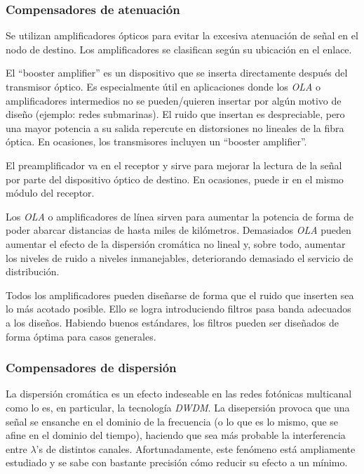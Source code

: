 \subsubsection{Compensadores de atenuación}
\label{sec:amplificadores}


Se utilizan amplificadores ópticos para evitar la excesiva atenuación
de señal en el nodo de destino. Los amplificadores se clasifican según
su ubicación en el enlace.

El ``booster amplifier'' es un dispositivo que se inserta directamente
después del transmisor óptico. Es especialmente útil en aplicaciones
donde los \emph{OLA} o amplificadores intermedios no se pueden/quieren
insertar por algún motivo de diseño (ejemplo: redes submarinas). El
ruido que insertan es despreciable, pero una mayor potencia a su
salida repercute en distorsiones no lineales de la fibra óptica. En
ocasiones, los transmisores incluyen un ``booster amplifier''.

El preamplificador va en el receptor y sirve para mejorar la lectura
de la señal por parte del dispositivo óptico de destino. En ocasiones,
puede ir en el mismo módulo del receptor.

Los \emph{OLA} o amplificadores de línea sirven para aumentar la
potencia de forma de poder abarcar distancias de hasta miles de
kilómetros. Demasiados \emph{OLA} pueden aumentar el efecto de la
dispersión cromática no lineal y, sobre todo, aumentar los niveles de
ruido a niveles inmanejables, deteriorando demasiado el servicio de
distribución.

Todos los amplificadores pueden diseñarse de forma que el ruido que
inserten sea lo más acotado posible. Ello se logra introduciendo
filtros pasa banda adecuados a los diseños. Habiendo buenos
estándares, los filtros pueden ser diseñados de forma óptima para
casos generales.

\subsubsection{Compensadores de dispersión}
\label{sec:dispersion}

La dispersión cromática es un efecto indeseable en las redes fotónicas
multicanal como lo es, en particular, la tecnología \emph{DWDM}. La
disepersión provoca que una señal se ensanche en el dominio de la
frecuencia (o lo que es lo mismo, que se afine en el dominio del
tiempo), haciendo que sea más probable la interferencia entre
$\lambda$'s de distintos canales. Afortunadamente, este fenómeno está
ampliamente estudiado y se sabe con bastante precisión cómo reducir su
efecto a un mínimo.

